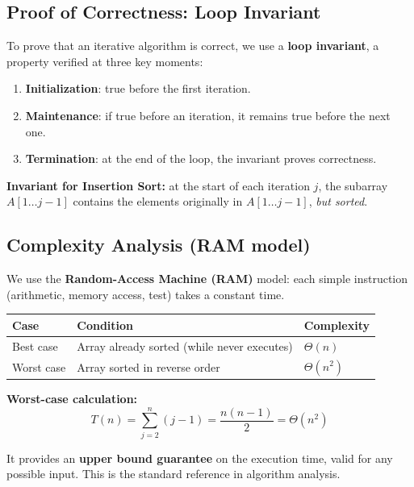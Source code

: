 \subsection{Proof of Correctness: Loop Invariant}

To prove that an iterative algorithm is correct, we use a \textbf{loop invariant},
a property verified at three key moments:

\begin{enumerate}
  \item \textbf{Initialization}: true before the first iteration.
  \item \textbf{Maintenance}: if true before an iteration, it remains true before the next one.
  \item \textbf{Termination}: at the end of the loop, the invariant proves correctness.
\end{enumerate}

\textbf{Invariant for Insertion Sort:} at the start of each iteration $j$, the
subarray $A[1 \ldots j-1]$ contains the elements originally in $A[1 \ldots j-1]$,
\emph{but sorted}.

\subsection{Complexity Analysis (RAM model)}

We use the \textbf{Random-Access Machine (RAM)} model: each simple instruction
(arithmetic, memory access, test) takes a constant time.

\begin{center}
\renewcommand{\arraystretch}{1.3}
\begin{tabular}{lll}
\toprule
\textbf{Case} & \textbf{Condition} & \textbf{Complexity} \\
\midrule
Best case    & Array already sorted (while never executes) & $\Theta(n)$ \\
Worst case   & Array sorted in reverse order              & $\Theta(n^2)$ \\
\bottomrule
\end{tabular}
\end{center}

\textbf{Worst-case calculation:}
\[
  T(n) = \sum_{j=2}^{n} (j-1) = \frac{n(n-1)}{2} = \Theta(n^2)
\]

\begin{tcolorbox}[colback=lightblue, colframe=keyblue, fonttitle=\bfseries,
                  title={Why focus on the worst case?}]
It provides an \textbf{upper bound guarantee} on the execution time, valid for any
possible input. This is the standard reference in algorithm analysis.
\end{tcolorbox}